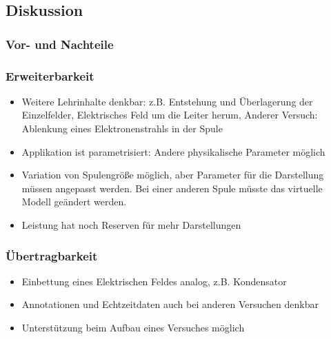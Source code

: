 \subsection{Diskussion}

\subsubsection{Vor- und Nachteile}
\subsubsection{Erweiterbarkeit}
\begin{itemize}
	\item Weitere Lehrinhalte denkbar: z.B. Entstehung und Überlagerung der Einzelfelder, Elektrisches Feld um die Leiter herum, Anderer Versuch: Ablenkung eines Elektronenstrahls in der Spule
	\item Applikation ist parametrisiert: Andere physikalische Parameter möglich
	\item Variation von Spulengröße möglich, aber Parameter für die Darstellung müssen angepasst werden. Bei einer anderen Spule müsste das virtuelle Modell geändert werden.
	\item Leistung hat noch Reserven für mehr Darstellungen
\end{itemize}

\subsubsection{Übertragbarkeit}
\begin{itemize}
	\item Einbettung eines Elektrischen Feldes analog, z.B. Kondensator
	\item Annotationen und Echtzeitdaten auch bei anderen Versuchen denkbar
	\item Unterstützung beim Aufbau eines Versuches möglich
\end{itemize}
	
	
	
	
	
	
	
	
	
	
	
	
	
	